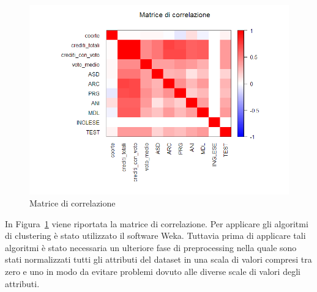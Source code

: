 \documentclass[12pt]{article}
\begin{document}
\begin{figure}[H]
	\includegraphics[width=\textwidth]{img/corMatrix.png}
	\caption{Matrice di correlazione}
	\label{fig:cMatrix}
\end{figure}

In Figura~\ref{fig:cMatrix} viene riportata la matrice di correlazione.
Per applicare gli algoritmi di clustering è stato utilizzato il software Weka. Tuttavia prima di applicare tali algoritmi è stato necessaria un ulteriore fase di preprocessing
nella quale sono stati normalizzati tutti gli attributi del data\-set in una scala di valori compresi tra zero e uno in modo da evitare problemi dovuto alle diverse scale di valori degli attributi.

\newpage
\end{document}
